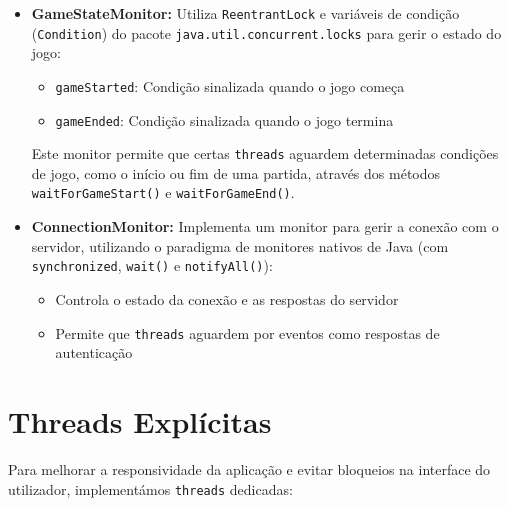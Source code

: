 \documentclass[12pt,a4paper]{report}
\begin{document}
\begin{itemize}
    \item \textbf{GameStateMonitor:} Utiliza \texttt{ReentrantLock} e variáveis de condição (\texttt{Condition}) do pacote \texttt{java.util.concurrent.locks} para gerir o estado do jogo:
    \begin{itemize}
        \item \texttt{gameStarted}: Condição sinalizada quando o jogo começa
        \item \texttt{gameEnded}: Condição sinalizada quando o jogo termina
    \end{itemize}
    Este monitor permite que certas \texttt{threads} aguardem determinadas condições de jogo, como o início ou fim de uma partida, através dos métodos \texttt{waitForGameStart()} e \texttt{waitForGameEnd()}.
    
    \item \textbf{ConnectionMonitor:} Implementa um monitor para gerir a conexão com o servidor, utilizando o paradigma de monitores nativos de Java (com \texttt{synchronized}, \texttt{wait()} e \texttt{notifyAll()}):
    \begin{itemize}
        \item Controla o estado da conexão e as respostas do servidor
        \item Permite que \texttt{threads} aguardem por eventos como respostas de autenticação
    \end{itemize}
\end{itemize}

\section{Threads Explícitas}

Para melhorar a responsividade da aplicação e evitar bloqueios na interface do utilizador, implementámos \texttt{threads} dedicadas:
\end{document}
